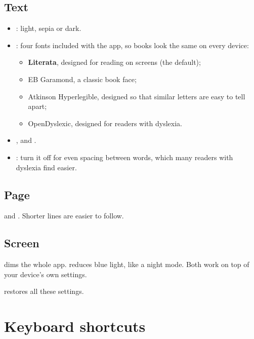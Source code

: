 \documentclass[11pt]{article}
\begin{document}
\subsection{Text}
\begin{itemize}
  \item {}: light, sepia or dark.
  \item {}: four fonts included with the app, so books look the same on every device:
  \begin{itemize}
    \item \textbf{Literata}, designed for reading on screens (the default);
    \item {\garamondfont EB Garamond}, a classic book face;
    \item {\sffamily Atkinson Hyperlegible}, designed so that similar letters are easy to tell
          apart;
    \item {\dyslexicfont OpenDyslexic}, designed for readers with dyslexia.
  \end{itemize}
  \item {},  and .
  \item {}: turn it off for even spacing between words, which many readers with
        dyslexia find easier.
\end{itemize}

\subsection{Page}
 and . Shorter lines are easier to follow.

\subsection{Screen}
 dims the whole app.  reduces blue light, like a night mode. Both work
on top of your device's own settings.

 restores all these settings.

\section{Keyboard shortcuts}
\end{document}
